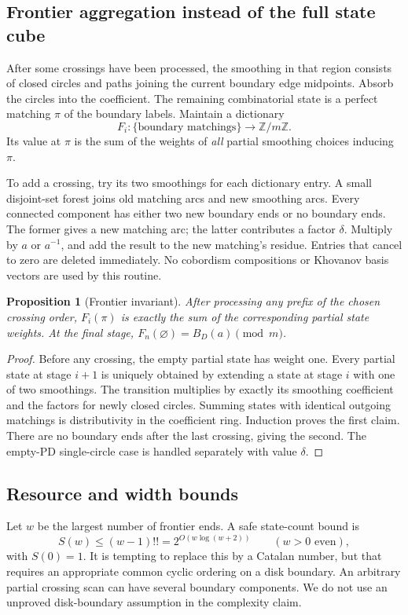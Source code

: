 \documentclass[11pt,a4paper]{article}
\newtheorem{proposition}[theorem]{Proposition}
\theoremstyle{definition}\newtheorem{remark}[theorem]{Remark}
\begin{document}
\subsection{Frontier aggregation instead of the full state cube}
After some crossings have been processed, the smoothing in that region consists
of closed circles and paths joining the current boundary edge midpoints. Absorb
the circles into the coefficient. The remaining combinatorial state is a perfect
matching $\pi$ of the boundary labels. Maintain a dictionary
\[
F_i:\{\text{boundary matchings}\}\longrightarrow\mathbb Z/m\mathbb Z.
\]
Its value at $\pi$ is the sum of the weights of \emph{all} partial smoothing
choices inducing $\pi$.

To add a crossing, try its two smoothings for each dictionary entry. A small
disjoint-set forest joins old matching arcs and new smoothing arcs. Every
connected component has either two new boundary ends or no boundary ends. The
former gives a new matching arc; the latter contributes a factor $\delta$.
Multiply by $a$ or $a^{-1}$, and add the result to the new matching's residue.
Entries that cancel to zero are deleted immediately. No cobordism compositions
or Khovanov basis vectors are used by this routine.

\begin{proposition}[Frontier invariant]
After processing any prefix of the chosen crossing order, $F_i(\pi)$ is exactly
the sum of the corresponding partial state weights. At the final stage,
$F_n(\varnothing)=B_D(a)\pmod m$.
\end{proposition}
\begin{proof}
Before any crossing, the empty partial state has weight one. Every partial state
at stage $i+1$ is uniquely obtained by extending a state at stage $i$ with one of
two smoothings. The transition multiplies by exactly its smoothing coefficient
and the factors for newly closed circles. Summing states with identical outgoing
matchings is distributivity in the coefficient ring. Induction proves the first
claim. There are no boundary ends after the last crossing, giving the second.
The empty-PD single-circle case is handled separately with value $\delta$.
\end{proof}

\subsection{Resource and width bounds}
Let $w$ be the largest number of frontier ends. A safe state-count bound is
\begin{equation}
S(w)\le(w-1)!!=2^{O(w\log(w+2))}\qquad(w>0\text{ even}),
\label{eq:matchingbound}
\end{equation}
with $S(0)=1$. It is tempting to replace this by a Catalan number, but that
requires an appropriate common cyclic ordering on a disk boundary. An arbitrary
partial crossing scan can have several boundary components. We do not use an
unproved disk-boundary assumption in the complexity claim.
\end{document}
